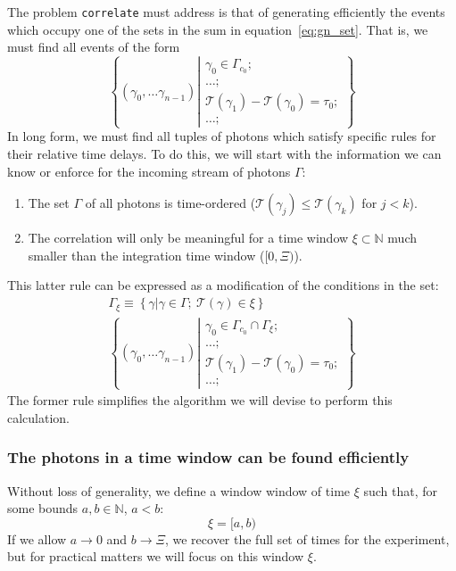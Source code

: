\documentclass{article}
\newcommand{\braces}[1]{\ensuremath{\left\lbrace #1 \right\rbrace}}
\newcommand{\correlate}{\texttt{correlate}}
\newcommand{\wholes}{\ensuremath{\mathbb{N}}}
\newcommand{\Time}{\ensuremath{\mathcal{T}}}
\newcommand{\photon}{\ensuremath{\gamma}}
\newcommand{\photons}{\ensuremath{\Gamma}}
\newcommand{\integrationtime}{\ensuremath{\Xi}}
\newcommand{\timewindow}{\ensuremath{\xi}}
\begin{document}
The problem \correlate{} must address is that of generating efficiently the events which occupy one of the sets in the sum in equation~\ref{eq:gn_set}. That is, we must find all events of the form
\begin{equation}
\braces{(\photon_{0},\ldots\photon_{n-1})
        \left|
        \begin{aligned}
        \photon_{0}\in\photons_{c_{0}};\\
        \ldots; \\
        \Time(\photon_{1})-\Time(\photon_{0})=\tau_{0};\\
        \ldots;
        \end{aligned}
        \right.}
\end{equation}
In long form, we must find all tuples of photons which satisfy specific rules for their relative time delays. To do this, we will start with the information we can know or enforce for the incoming stream of photons \photons:
\begin{enumerate}
\item The set \photons{} of all photons is time-ordered ($\Time(\photon_{j})\le\Time(\photon_{k})$ for $j<k$).
\item The correlation will only be meaningful for a time window $\timewindow\subset\wholes$ much smaller than the integration time window ($[0, \integrationtime)$).
\end{enumerate}
This latter rule can be expressed as a modification of the conditions in the set:
\begin{align}
\photons_{\timewindow}\equiv\braces{\photon\left|\photon\in\photons;~\Time(\photon)\in\timewindow\right.}\\
\braces{(\photon_{0},\ldots\photon_{n-1})
        \left|
        \begin{aligned}
        \photon_{0}\in\photons_{c_{0}}\cap\photons_{\timewindow};\\
        \ldots; \\
        \Time(\photon_{1})-\Time(\photon_{0})=\tau_{0};\\
        \ldots;
        \end{aligned}
        \right.}
\end{align}
The former rule simplifies the algorithm we will devise to perform this calculation.

\subsubsection{The photons in a time window can be found efficiently}
Without loss of generality, we define a window window of time $\timewindow$ such that, for some bounds $a,b\in\wholes$, $a<b$:
\begin{equation}
\timewindow = [a,b)
\end{equation}
If we allow $a\rightarrow0$ and $b\rightarrow\integrationtime$, we recover the full set of times for the experiment, but for practical matters we will focus on this window \timewindow.
\end{document}
